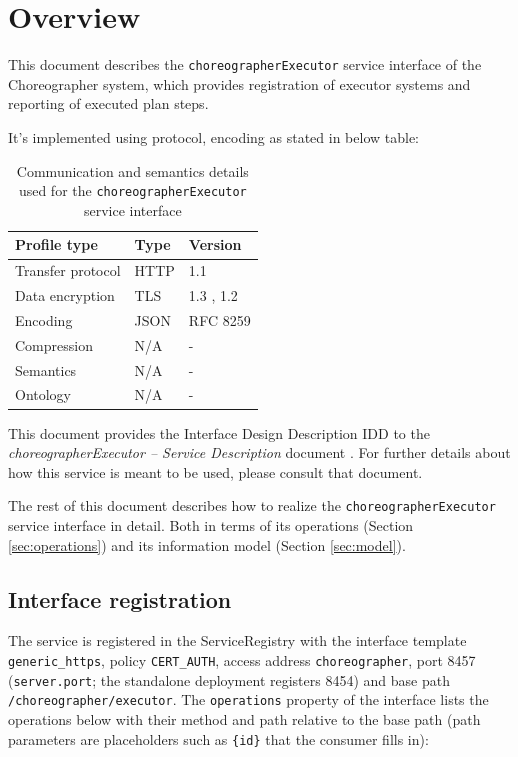 \documentclass[a4paper]{arrowhead}
\begin{document}
\section{Overview}
\label{sec:overview}

This document describes the \texttt{choreographer\allowbreak{}Executor} service interface of the Choreographer system, which provides registration of executor systems and reporting of executed plan steps.

It's implemented using protocol, encoding as stated in below table:
\begin{table}[ht!]
  \centering
  \begin{tabular}{|l|l|l|}
    \hline
    \rowcolor{gray!33} Profile type & Type & Version \\ \hline
    Transfer protocol & HTTP & 1.1 \cite{rfc9112} \\ \hline
    Data encryption & TLS & 1.3 \cite{rfc8446}, 1.2 \cite{rfc5246} \\ \hline
    Encoding & JSON & RFC 8259 \cite{rfc8259} \\ \hline
    Compression & N/A & - \\ \hline
    Semantics & N/A & - \\ \hline
    Ontology & N/A & - \\ \hline
  \end{tabular}
  \caption{Communication and semantics details used for the \texttt{choreographer\allowbreak{}Executor} service interface}
  \label{tab:comunication_semantics_profile}
\end{table}

This document provides the Interface Design Description IDD to the \textit{choreographerExecutor -- Service Description} document \cite{cho-choreographerExecutor-sd}.
For further details about how this service is meant to be used, please consult that document.

The rest of this document describes how to realize the \texttt{choreographer\allowbreak{}Executor} service
interface in detail. Both in terms of its operations (Section \ref{sec:operations}) and its information model (Section \ref{sec:model}).

\subsection{Interface registration}

The service is registered in the ServiceRegistry with the interface template \texttt{generic\_\allowbreak{}https}, policy \texttt{CERT\_\allowbreak{}AUTH}, access address \texttt{choreographer}, port 8457 (\texttt{server.\allowbreak{}port}; the standalone deployment registers 8454) and base path \texttt{/\allowbreak{}choreographer/\allowbreak{}executor}. The \texttt{operations} property of the interface lists the operations below with their method and path relative to the base path (path parameters are placeholders such as \texttt{\{id\}} that the consumer fills in):
\end{document}
